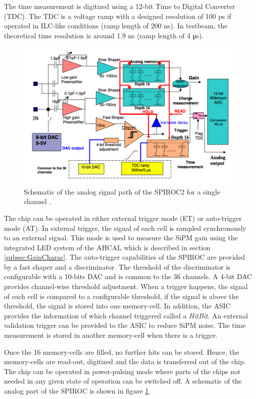The time measurement is digitized using a 12-bit Time to Digital Converter (TDC). The TDC is a voltage ramp with a designed resolution of 100 ps if operated in ILC-like conditions (ramp length of 200 \si{\nano\second}). In testbeam, the theoretical time resolution is around 1.9 ns (ramp length of 4 \si{\micro\second}).

\begin{figure}[htbp!]
  \centering
  \includegraphics[width=0.7\linewidth]{chap3/fig/SPIROC2B_schematic.png}
  \caption{Schematic of the analog signal path of the SPIROC2 for a single channel \cite{SPIROC2_datasheet}.} \label{fig:SPIROC2B_sche}
\end{figure}

The chip can be operated in either external trigger mode (ET) or auto-trigger mode (AT). In external trigger, the signal of each cell is sampled synchronously to an external signal. This mode is used to measure the SiPM gain using the integrated LED system of the AHCAL which is described in section \ref{subsec:GainCharac}. The auto-trigger capabilities of the SPIROC are provided by a fast shaper and a discriminator. The threshold of the discriminator is configurable with a 10-bits DAC and is common to the 36 channels. A 4-bit DAC provides channel-wise threshold adjustment. When a trigger happens, the signal of each cell is compared to a configurable threshold, if the signal is above the threshold, the signal is stored into one memory-cell. In addition, the ASIC provides the information of which channel triggered called a \textit{HitBit}. An external validation trigger can be provided to the ASIC to reduce SiPM noise. The time measurement is stored in another memory-cell when there is a trigger.

Once the 16 memory-cells are filled, no further hits can be stored. Hence, the memory-cells are read-out, digitized and the data is transferred out of the chip. The chip can be operated in power-pulsing mode where parts of the chips not needed in any given state of operation can be switched off. A schematic of the analog part of the SPIROC is shown in figure \ref{fig:SPIROC2B_sche}.

